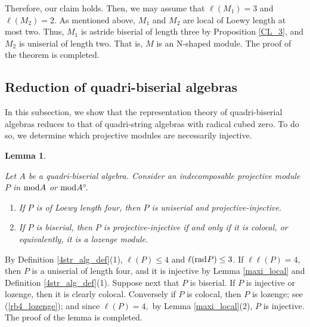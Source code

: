 \documentclass[10pt]{amsart}
\newtheorem{Lemma}[Theo]{Lemma}
\theoremstyle{definition}
\newcommand{\mmod}{{\rm mod}}
\newcommand{\rad}{{\rm rad}\hspace{.5pt}}
\begin{document}
Therefore, our claim holds. Then, we may assume that $\ell(M_1)=3$ and $\ell(M_2)=2$. As mentioned above, $M_1$ and $M_2$ are local of Loewy length at most two. Thus, $M_1$ is astride biserial of length three by Proposition \ref{CL_3}, and $M_2$ is uniserial of length two. That is, $M$ is an N-shaped module. The proof of the theorem is completed.


\subsection{\sc Reduction of quadri-biserial algebras} In this subsection, we show that the representation theory of quadri-biserial algebras reduces to that of quadri-string algebras with radical cubed zero. To do so, we determine which projective modules are necessarily injective.

\begin{Lemma}\label{4sa_ninj_prj}

Let $A$ be a quadri-biserial algebra. Consider an indecomposable projective module $P$ in $\mmod A$ or $\mmod A^\circ\hspace{-1pt}.$

\begin{enumerate}[$(1)$]

\vspace{-2pt}
    
\item If $P$ is of Loewy length four, then $P$ is uniserial and projective-injective.

\item If $P$ is biserial, then $P$ is projective-injective if and only if it is colocal, \vspace{-.5pt} or equivalently, it is a lozenge module.
    
\end{enumerate}\end{Lemma}

\vspace{-1pt}

 By Definition \ref{4str_alg_def}(1), $\ell(P)\le 4$ and $\ell(\rad P)\le 3$. If $\ell\ell(P)=4,$ then $P$ is a uniserial of length four, and it is injective by Lemma \ref{maxi_local} and Definition \ref{4str_alg_def}(1). 
Suppose next that $P$ is biserial. If $P$ is injective or lozenge, then it is clearly colocal. Conversely if $P$ is colocal, then  $P$ is lozenge; see (\ref{rb4_lozenge}); and since $\ell(P)=4,$  by Lemma \ref{maxi_local}(2), $P$ is injective. The proof of the lemma is completed. 
\end{document}
